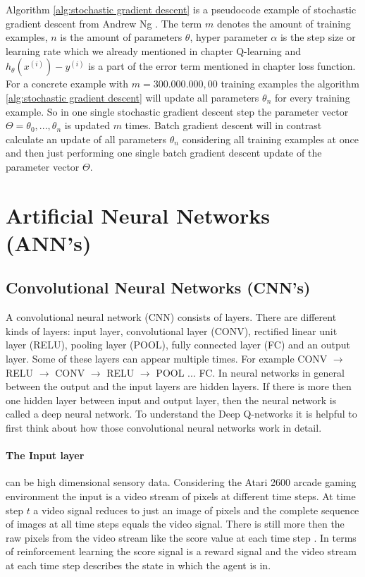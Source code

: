 \documentclass[conference]{IEEEtran}
\begin{document}
Algorithm \ref{alg:stochastic gradient descent} is a pseudocode example of stochastic gradient descent from Andrew Ng \cite{ng_2017}. The term $m$ denotes the amount of training examples, $n$ is the amount of parameters $\theta$, hyper parameter $\alpha$ is the step size or learning rate which we already mentioned in chapter Q-learning and $h_\theta(x^{(i)}) - y^{(i)}$ is a part of the error term mentioned in chapter loss function. For a concrete example with $m = 300.000.000,00$ training examples the algorithm \ref{alg:stochastic gradient descent} will update all parameters $\theta_n$ for every training example. So in one single stochastic gradient descent step the parameter vector $\Theta = \theta_0, ..., \theta_n$ is updated $m$ times. Batch gradient descent will in contrast calculate an update of all parameters $\theta_n$ considering all training examples at once and then just performing one single batch gradient descent update of the parameter vector $\Theta$.

\section{Artificial Neural Networks (ANN's)}

\subsection{Convolutional Neural Networks (CNN's)}

A convolutional neural network (CNN) consists of layers. There are different kinds of layers: input layer, convolutional layer (CONV), rectified linear unit layer (RELU), pooling layer (POOL), fully connected layer (FC) and an output layer. Some of these layers can appear multiple times. For example CONV $\rightarrow$ RELU $\rightarrow$ CONV $\rightarrow$ RELU $\rightarrow$ POOL ... FC. In neural networks in general between the output and the input layers are hidden layers. If there is more then one hidden layer between input and output layer, then the neural network is called a deep neural network. To understand the Deep Q-networks it is helpful to first think about how those convolutional neural networks work in detail. 

\paragraph{The Input layer} can be high dimensional sensory data. Considering the Atari 2600 arcade gaming environment \cite{DBLP:journals/corr/MnihBMGLHSK16, DBLP:journals/corr/HasseltGS15, DRL:HumanLevelControl} the input is a video stream of pixels at different time steps. At time step $t$ a video signal reduces to just an image of pixels and the complete sequence of images at all time steps equals the video signal. There is still more then the raw pixels from the video stream like the score value at each time step \cite{DRL:HumanLevelControl}. In terms of reinforcement learning the score signal is a reward signal and the video stream at each time step describes the state in which the agent is in.
\end{document}
